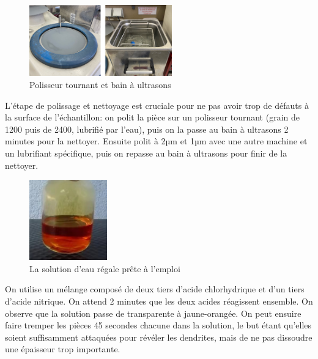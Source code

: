 
\begin{figure}[H]
    \centering
    \includegraphics[width=0.55\textwidth]{images/WechatIMG1126.jpeg}
    \caption{Polisseur tournant et bain à ultrasons}
    \label{fig:polisseur_bain_ultrasons}
\end{figure}


L'étape de polissage et nettoyage est cruciale pour ne pas avoir 
trop de défauts à la surface de l'échantillon:
on polit la pièce sur un polisseur tournant (grain de 1200 puis de 2400, lubrifié par l'eau),
puis on la passe au bain à ultrasons 2 minutes pour la nettoyer.
Ensuite polit à 2µm et 1µm avec une autre machine et un lubrifiant spécifique,
puis on repasse au bain à ultrasons pour finir de la nettoyer.\\


\begin{figure}[H]
    \centering
    \includegraphics[width=0.3\textwidth]{images/WechatIMG1128.jpeg}
    \caption{La solution d'eau régale prête à l'emploi}
    \label{fig:eau_regale}
\end{figure}


On utilise un mélange composé de deux tiers d'acide chlorhydrique 
et d'un tiers d'acide nitrique.
On attend 2 minutes que les deux acides réagissent ensemble.
On observe que la solution passe de transparente à jaune-orangée.
On peut ensuire faire tremper les pièces 45 secondes chacune dans la solution, 
le but étant qu'elles soient suffisamment attaquées pour révéler les dendrites, 
mais de ne pas dissoudre une épaisseur trop importante.\\


